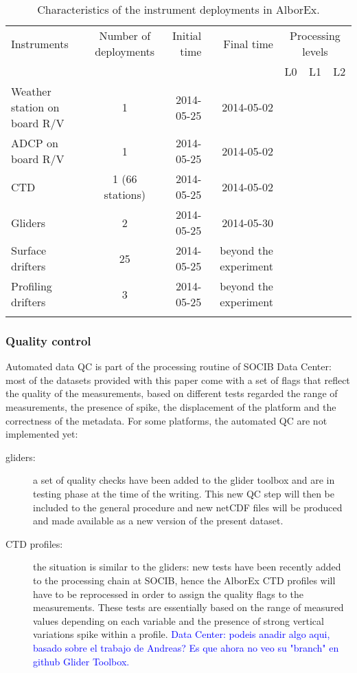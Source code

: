 \documentclass[essd]{copernicus}
\newcommand{\charles}[1]{\textcolor{blue}{#1}}
\begin{document}
\begin{table*}[htpb]
\caption{Characteristics of the instrument deployments in AlborEx.\label{tab:deployment}}
\begin{tabular}{lcrrccc}
\tophline
Instruments 		& Number of deployments & Initial time	& Final time			& \multicolumn{3}{c}{Processing levels} \\
					& 						& 				& 						& L0 			& L1 		& L2 \\
\middlehline
Weather station on board R/V	& 1			& 2014-05-25	& 2014-05-02			& \checkmark	& \checkmark &  \\ 
ADCP on board R/V	& 1						& 2014-05-25	& 2014-05-02			& \checkmark	& \checkmark &  \\ 
CTD					& 1 (66 stations)		& 2014-05-25	& 2014-05-02			& \checkmark	& \checkmark &  \\ 
Gliders 			& 2						& 2014-05-25	& 2014-05-30 			& \checkmark 	& \checkmark & \checkmark \\
Surface drifters	& 25					& 2014-05-25	& beyond the experiment & \checkmark 	& \checkmark &  \\
Profiling drifters	& 3						& 2014-05-25	& beyond the experiment & \checkmark 	& \checkmark &  \\
\bottomhline
\end{tabular}
\belowtable{} %
\end{table*}

\subsubsection{Quality control}

Automated data QC is part of the processing routine of SOCIB Data Center: most of the datasets provided with this paper come with a set of flags that reflect the quality of the measurements, based on different tests regarded the range of measurements, the presence of spike, the displacement of the platform and the correctness of the metadata. For some platforms, the automated QC are not implemented yet:
\begin{description}
\item[gliders:] a set of quality checks have been added to the glider toolbox \citep[][and available at \url{https://github.com/socib/glider_toolbox}]{TROUPIN16} and are in testing phase at the time of the writing. This new QC step will then be included to the general procedure and new netCDF files will be produced and made available as a new version of the present dataset.
\item[CTD profiles:] the situation is similar to the gliders: new tests have been recently added to the processing chain at SOCIB, hence the AlborEx CTD profiles will have to be reprocessed in order to assign the quality flags to the measurements. These tests are essentially based on the range of measured values depending on each variable and the presence of strong vertical variations spike within a profile. \charles{Data Center: podeis anadir algo aqui, basado sobre el trabajo de Andreas? Es que ahora no veo su "branch" en github Glider Toolbox.}
\end{description}
\end{document}
